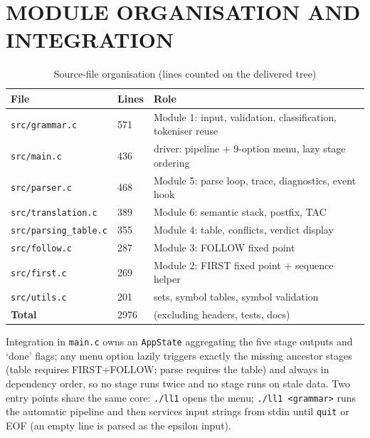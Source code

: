 \documentclass[12pt,a4paper,oneside,openany]{report}
\newcommand{\code}[1]{\texttt{#1}}
\begin{document}
\section{MODULE ORGANISATION AND INTEGRATION}
\begin{table}[h]
  \caption{Source-file organisation (lines counted on the delivered tree)}
  \label{tab:files}
  \small
  \begin{tabularx}{\textwidth}{p{4.6cm}p{1.6cm}X}
    \toprule
    \textbf{File} & \textbf{Lines} & \textbf{Role} \\
    \midrule
    \code{src/grammar.c} & 571 & Module 1: input, validation, classification,
    tokeniser reuse \\
    \code{src/main.c} & 436 & driver: pipeline + 9-option menu, lazy
    stage ordering \\
    \code{src/parser.c} & 468 & Module 5: parse loop, trace, diagnostics,
    event hook \\
    \code{src/translation.c} & 389 & Module 6: semantic stack, postfix,
    TAC \\
    \code{src/parsing\_table.c} & 355 & Module 4: table, conflicts,
    verdict display \\
    \code{src/follow.c} & 287 & Module 3: FOLLOW fixed point \\
    \code{src/first.c} & 269 & Module 2: FIRST fixed point + sequence
    helper \\
    \code{src/utils.c} & 201 & sets, symbol tables, symbol validation \\
    \midrule
    \textbf{Total} & 2976 & (excluding headers, tests, docs) \\
    \bottomrule
  \end{tabularx}
\end{table}

Integration in \code{main.c} owns an \code{AppState} aggregating the five
stage outputs and `done' flags; any menu option lazily triggers exactly
the missing ancestor stages (table requires FIRST+FOLLOW; parse requires
the table) and always in dependency order, so no stage runs twice and no
stage runs on stale data. Two entry points share the same core:
\code{./ll1} opens the menu; \code{./ll1 <grammar>} runs the automatic
pipeline and then services input strings from stdin until \code{quit} or
EOF (an empty line is parsed as the epsilon input).



\end{document}
